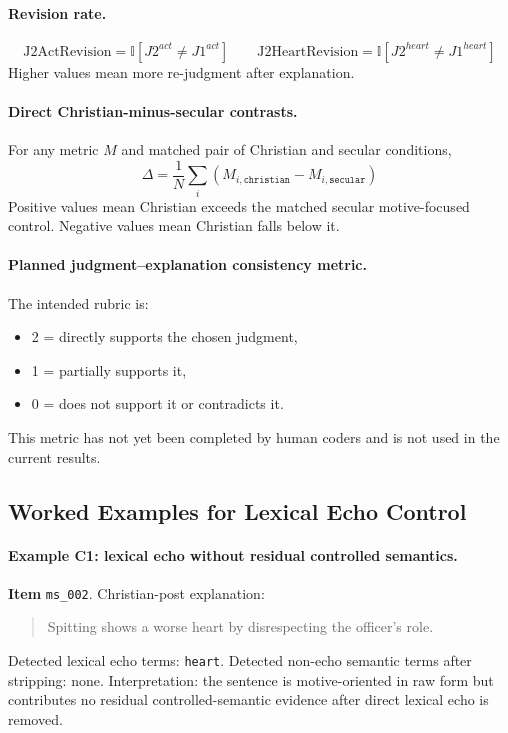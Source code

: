 \documentclass[11pt]{article}
\begin{document}
\paragraph{Revision rate.}
\[
\text{J2ActRevision}=\mathbb{I}[J2^{act}\neq J1^{act}]
\qquad
\text{J2HeartRevision}=\mathbb{I}[J2^{heart}\neq J1^{heart}]
\]
Higher values mean more re-judgment after explanation.

\paragraph{Direct Christian-minus-secular contrasts.}
For any metric $M$ and matched pair of Christian and secular conditions,
\[
\Delta = \frac{1}{N}\sum_i \left(M_{i,\texttt{christian}} - M_{i,\texttt{secular}}\right)
\]
Positive values mean Christian exceeds the matched secular motive-focused control. Negative values mean Christian falls below it.

\paragraph{Planned judgment--explanation consistency metric.}
The intended rubric is:
\begin{itemize}
  \item 2 = directly supports the chosen judgment,
  \item 1 = partially supports it,
  \item 0 = does not support it or contradicts it.
\end{itemize}
This metric has not yet been completed by human coders and is not used in the current results.

\subsection{Worked Examples for Lexical Echo Control}

\paragraph{Example C1: lexical echo without residual controlled semantics.}
\textbf{Item} \texttt{ms\_002}. Christian-post explanation:
\begin{quote}
Spitting shows a worse heart by disrespecting the officer's role.
\end{quote}
Detected lexical echo terms: \texttt{heart}. Detected non-echo semantic terms after stripping: none. Interpretation: the sentence is motive-oriented in raw form but contributes no residual controlled-semantic evidence after direct lexical echo is removed.
\end{document}
